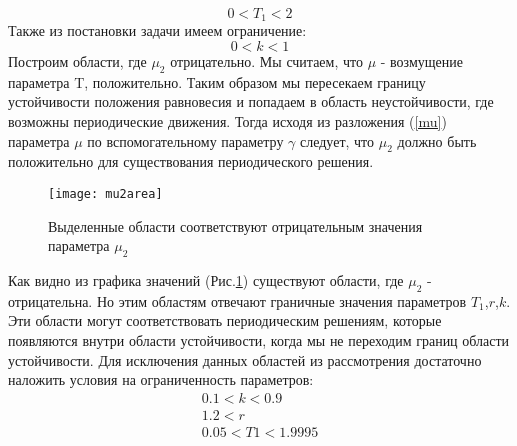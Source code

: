 \documentclass[12pt]{article}
\begin{document}
\begin{equation*}
    0<T_1 <2
\end{equation*}
Также из постановки задачи имеем ограничение:
\begin{equation*}
    0<k<1 
\end{equation*}
Построим области, где $\mu_2$ отрицательно. Мы считаем, что $\mu$ - возмущение параметра T, положительно. Таким образом мы пересекаем границу устойчивости положения равновесия и попадаем в область неустойчивости, где возможны периодические движения. Тогда исходя из разложения (\ref{mu}) параметра $\mu$ по вспомогательному параметру $\gamma$ следует, что $\mu_2$ должно быть положительно для существования периодического решения.
\begin{figure}
    \centering
    \texttt{[image: mu2area]}
    \caption{Выделенные области соответствуют отрицательным значения параметра $\mu_2$}
    \label{fig:mu2}
\end{figure}
Как видно из графика значений (Рис.\ref{fig:mu2}) существуют области, где $\mu_2$ - отрицательна. Но этим областям отвечают граничные значения параметров $T_1$,$r$,$k$. Эти области могут соответствовать периодическим решениям, которые появляются внутри области устойчивости, когда мы не переходим границ области устойчивости. Для исключения данных областей из рассмотрения достаточно наложить условия на ограниченность параметров:
\begin{align*}
    0.1<k<0.9\\
    1.2 < r\\
    0.05 < T1 < 1.9995
\end{align*}
\newpage
\end{document}
